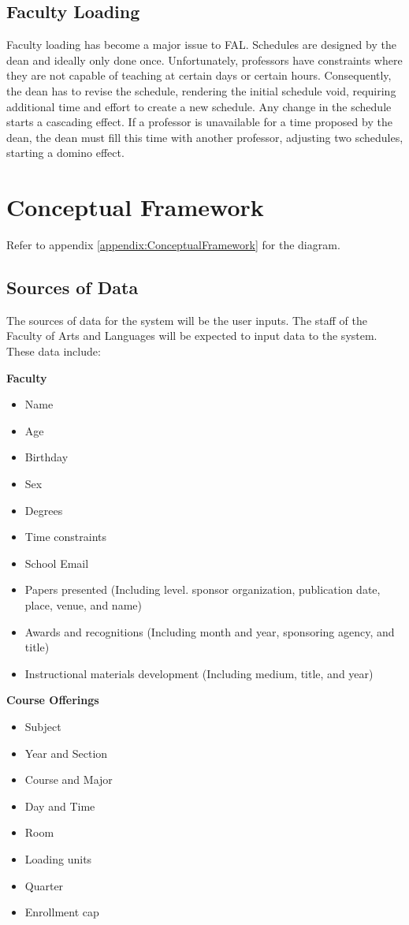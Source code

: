 \subsection{Faculty Loading}
Faculty loading has become a major issue to FAL. Schedules are designed by the dean and ideally only done once. Unfortunately, professors have constraints where they are not capable of teaching at certain days or certain hours. Consequently, the dean has to revise the schedule, rendering the initial schedule void, requiring additional time and effort to create a new schedule. Any change in the schedule starts a cascading effect. If a professor is unavailable for a time proposed by the dean, the dean must fill this time with another professor, adjusting two schedules, starting a domino effect.

\section{Conceptual Framework}
Refer to appendix \ref{appendix:ConceptualFramework} for the diagram.

\subsection{Sources of Data}
The sources of data for the system will be the user inputs. The staff of the Faculty of Arts and Languages will be expected to input data to the system. These data include: 

\textbf{Faculty}
\begin{itemize}
\item Name
\item Age
\item Birthday
\item Sex
\item Degrees
\item Time constraints
\item School Email
\item Papers presented (Including level. sponsor organization, publication date, place, venue, and name)
\item Awards and recognitions (Including month and year, sponsoring agency, and title)
\item Instructional materials development (Including medium, title, and year)
\end{itemize}

\textbf{Course Offerings}
\begin{itemize}
\item Subject
\item Year and Section
\item Course and Major
\item Day and Time
\item Room
\item Loading units
\item Quarter
\item Enrollment cap
\end{itemize}

